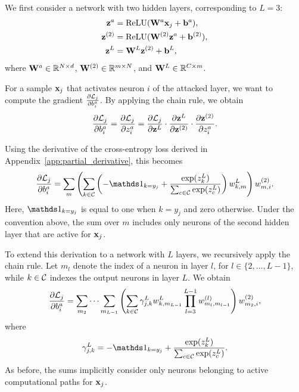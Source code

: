 We first consider a network with two hidden layers, corresponding to $L=3$:
\begin{align*}
{\mathbf{z}}^{a} &= \textrm{ReLU}(\mathbf{W}^{a} {\mathbf{x}}_j+{\mathbf{b}}^{a}), \\
{\mathbf{z}}^{(2)} &= \textrm{ReLU}(\mathbf{W}^{(2)} {\mathbf{z}}^{a}+{\mathbf{b}}^{(2)}), \\
{\mathbf{z}}^{L} &= \mathbf{W}^{L} {\mathbf{z}}^{(2)}+{\mathbf{b}}^{L},
\end{align*}
where $\mathbf{W}^{a} \in \mathbb{R}^{N\times d}$,
$\mathbf{W}^{(2)} \in \mathbb{R}^{m\times N}$, and
$\mathbf{W}^{L} \in \mathbb{R}^{C\times m}$.

For a sample ${\mathbf{x}}_j$ that activates neuron $i$ of the attacked layer, we want to compute the gradient $\frac{\partial{\ensuremath{\mathcal{L}}_j}}{\partial{b^{a}_i}}$. By applying the chain rule, we obtain
\begin{equation}
\label{eq:chain_rule_3_layers}
\frac{\partial{\ensuremath{\mathcal{L}}_j}}{\partial{b^{a}_i}}
=
\frac{\partial{\ensuremath{\mathcal{L}}_j}}{\partial{z^{a}_i}}
=
\frac{\partial{\ensuremath{\mathcal{L}}_j}}{\partial{{\mathbf{z}}^{L}}}
\cdot
\frac{\partial{{\mathbf{z}}^{L}}}{\partial{{\mathbf{z}}^{(2)}}}
\cdot
\frac{\partial{{\mathbf{z}}^{(2)}}}{\partial{z_i^{a}}}.
\end{equation}

Using the derivative of the cross-entropy loss derived in Appendix~\ref{app:partial_derivative}, this becomes
\begin{equation}
\label{eq:dl_db_mult}
\frac{\partial{\loss_j}}{\partial{b^{a}_i}}
=
\sum_m
\left(
\sum_{k\in\C}
\left(
-\indicator_{k=y_j}
+
\frac{\exp(z^{L}_k)}
{\sum_{c\in\C}\exp(z^{L}_c)}
\right)
w_{k,m}^{L}
\right)
w_{m,i}^{(2)}.
\end{equation}
Here, $\indicator_{k=y_j}$ is equal to one when $k=y_j$ and zero otherwise. Under the convention above, the sum over $m$ includes only neurons of the second hidden layer that are active for ${\mathbf{x}}_j$.

To extend this derivation to a network with $L$ layers, we recursively apply the chain rule. Let $m_l$ denote the index of a neuron in layer $l$, for $l\in\{2,\ldots,L-1\}$, while $k\in\mathcal{C}$ indexes the output neurons in layer $L$. We obtain
\begin{equation}
\label{eq:dl_db_general}
\frac{\partial{\ensuremath{\mathcal{L}}_j}}{\partial{b^{a}_i}}
=
\sum_{m_2}\cdots\sum_{m_{L-1}}
\left(
\sum_{k\in\mathcal{C}}
\gamma_{j,k}^{L}
w_{k,m_{L-1}}^{L}
\prod_{l=3}^{L-1}
w_{m_l,m_{l-1}}^{(l)}
\right)
w_{m_2,i}^{(2)},
\end{equation}
where
\begin{equation}
\gamma_{j,k}^{L}
=
-\indicator_{k=y_j}
+
\frac{\exp(z_k^{L})}
{\sum_{c\in\C}\exp(z_c^{L})}.
\end{equation}
As before, the sums implicitly consider only neurons belonging to active computational paths for ${\mathbf{x}}_j$.


